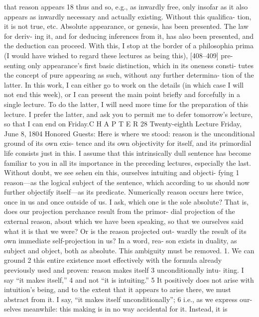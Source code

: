 that reason appears 18 thus and so, e.g., as inwardly free, only insofar as it also
appears as inwardly necessary and actually existing. Without this qualifica-
tion, it is not true, etc.
Absolute appearance, or genesis, has been presented. The law for deriv-
ing it, and for deducing inferences from it, has also been presented, and the
deduction can proceed. With this, I stop at the border of a philosophia prima
(I would have wished to regard these lectures as being this), [408–409] pre-
senting only appearance’s first basic distinction, which in its oneness consti-
tutes the concept of pure appearing as such, without any further determina-
tion of the latter. In this work, I can either go to work on the details (in which
case I will not end this week), or I can present the main point briefly and
forcefully in a single lecture. To do the latter, I will need more time for the
preparation of this lecture. I prefer the latter, and ask you to permit me to
defer tomorrow’s lecture, so that I can end on Friday.C H A P T E R
28
Twenty-eighth Lecture
Friday, June 8, 1804
Honored Guests:
Here is where we stood: reason is the unconditional ground of its own exis-
tence and its own objectivity for itself, and its primordial life consists just in
this. I assume that this intrinsically dull sentence has become familiar to you
in all its importance in the preceding lectures, especially the last.
Without doubt, we see {sehen ein} this, ourselves intuiting and objecti-
fying 1 reason—as the logical subject of the sentence, which according to us
should now further objectify itself—as its predicate. Numerically reason
occurs here twice, once in us and once outside of us. I ask, which one is the
sole absolute? That is, does our projection perchance result from the primor-
dial projection of the external reason, about which we have been speaking, so
that we ourselves said what it is that we were? Or is the reason projected out-
wardly the result of its own immediate self-projection in us? In a word, rea-
son exists in duality, as subject and object, both as absolute. This ambiguity
must be removed.
1. We can ground 2 this entire existence most effectively with the formula
already previously used and proven: reason makes itself 3 unconditionally intu-
iting. I say “it makes itself,” 4 and not “it is intuiting.” 5 It positively does not arise
with intuition’s being, and to the extent that it appears to arise there, we must
abstract from it. I say, “it makes itself unconditionally”; 6 i.e., as we express our-
selves meanwhile: this making is in no way accidental for it. Instead, it is
